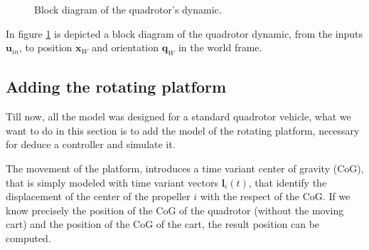 \begin{figure}[h]
	\caption{Block diagram of the quadrotor's dynamic.}
	\label{fig:quadDynBlock}
\end{figure}

\noindent In figure \ref{fig:quadDynBlock} is depicted a block diagram of the quadrotor dynamic, from the inputs $\mathbf{u}_{in}$, to position $\mathbf{x}_W$ and orientation $\mathbf{q}_W$ in the world frame.

\subsection{Adding the rotating platform}
\label{addPlatform}

Till now, all the model was designed for a standard quadrotor vehicle, what we want to do in this section is to add the model of the rotating platform, necessary for deduce a controller and simulate it.

\noindent The movement of the platform, introduces a time variant center of gravity (CoG), that is simply modeled with time variant vectors $\mathbf{l}_i(t)$, that identify the displacement of the center of the propeller $i$ with the respect of the CoG. If we know precisely the position of the CoG of the quadrotor (without the moving cart) and the position of the CoG of the cart, the result position can be computed.


